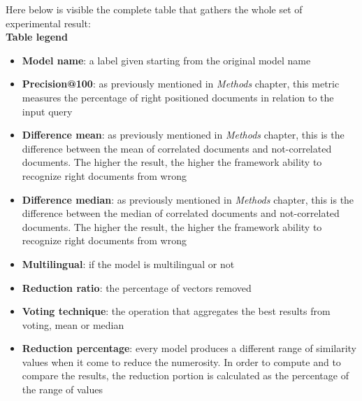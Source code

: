 \documentclass[\main/main.tex]{subfiles}
\begin{document}
Here below is visible the complete table that gathers the whole set of experimental result:\\
\textbf{Table legend}
\begin{itemize}
    \item \textbf{Model name}: a label given starting from the original model name
    \item \textbf{Precision@100}: as previously mentioned in \emph{Methods} chapter, this metric measures the percentage of right positioned documents in relation to the input query
    \item \textbf{Difference mean}: as previously mentioned in \emph{Methods} chapter, this is the difference between the mean of correlated documents and not-correlated documents. The higher the result, the higher the framework ability to recognize right documents from wrong
    \item \textbf{Difference median}: as previously mentioned in \emph{Methods} chapter, this is the difference between the median of correlated documents and not-correlated documents. The higher the result, the higher the framework ability to recognize right documents from wrong
    \item \textbf{Multilingual}: if the model is multilingual or not
    \item \textbf{Reduction ratio}: the percentage of vectors removed
    \item \textbf{Voting technique}: the operation that aggregates the best results from voting, mean or median
    \item \textbf{Reduction percentage}: every model produces a different range of similarity values when it come to reduce the numerosity. In order to compute and to compare the results, the reduction portion is calculated as the percentage of the range of values
\end{itemize}
\end{document}
